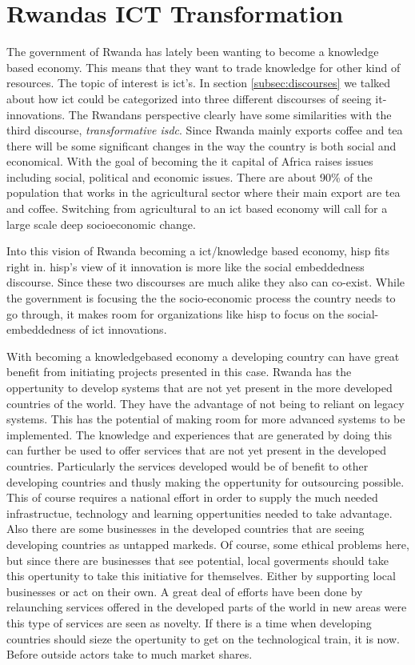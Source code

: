 \section{Rwandas ICT Transformation}
The government of Rwanda has lately been wanting to become a knowledge based economy. 
This means that they want to trade knowledge for other kind of resources. 
The topic of interest is \gls{ict}'s.
In section \ref{subsec:discourses} we talked about how \gls{ict} could be categorized into three different discourses of seeing \gls{it}-innovations. 
The Rwandans perspective clearly have some similarities with the third discourse, \textit{transformative \gls{isdc}}. 
Since Rwanda mainly exports coffee and tea there will be some significant changes in the way the country is both social and economical. 
With the goal of becoming the \gls{it} capital of Africa raises issues including social, political and economic issues. 
There are about 90\% of the population that works in the agricultural sector where their main export are tea and coffee. 
Switching from agricultural to an \gls{ict} based economy will call for a large scale deep socioeconomic change.

Into this vision of Rwanda becoming a \gls{ict}/knowledge based economy, \gls{hisp} fits right in.
\gls{hisp}'s view of \gls{it} innovation is more like the social embeddedness discourse.
Since these two discourses are much alike they also can co-exist. While the government is focusing the the socio-economic process the country needs to go through, it makes room for organizations like \gls{hisp} to focus on the social-embeddedness of \gls{ict} innovations.

With becoming a knowledgebased economy a developing country can have great benefit from initiating projects presented in this case.
Rwanda has the oppertunity to develop systems that are not yet present in the more developed countries of the world.
They have the advantage of not being to reliant on legacy systems. 
This has the potential of making room for more advanced systems to be implemented. 
The knowledge and experiences that are generated by doing this can further be used to offer services that are not yet present in the developed countries. 
Particularly the services developed would be of benefit to other developing countries and thusly making the oppertunity for outsourcing possible. 
This of course requires a national effort in order to supply the much needed infrastructue, technology and learning oppertunities needed to take advantage. 
Also there are some businesses in the developed countries that are seeing developing countries as untapped markeds.
Of course, some ethical problems here, but since there are businesses that see potential, local goverments should take this opertunity to take this initiative for themselves. Either by supporting local businesses or act on their own. 
A great deal of efforts have been done by relaunching services offered in the developed parts of the world in new areas were this type of services are seen as novelty.
If there is a time when developing countries should sieze the opertunity to get on the technological train, it is now. 
Before outside actors take to much market shares. 




